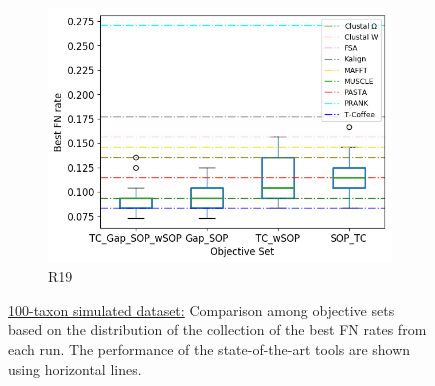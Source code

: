 \begin{figure}[!htbp]
\begin{adjustwidth}{-1cm}{-1cm}
\begin{subfigure}{0.22\textwidth}
			\includegraphics[width=\columnwidth]{Figure/summary/precomputedInit/R19/objset_fnrate_rank}
			\caption{R19}
		\end{subfigure}
		\caption{\underline{100-taxon simulated dataset:} Comparison among objective sets based on the distribution of the collection of the best FN rates from each run. The performance of the state-of-the-art tools are shown using horizontal lines.}
		\label{fig:rank_best_fn_rate}
	\end{adjustwidth}
\end{figure}


